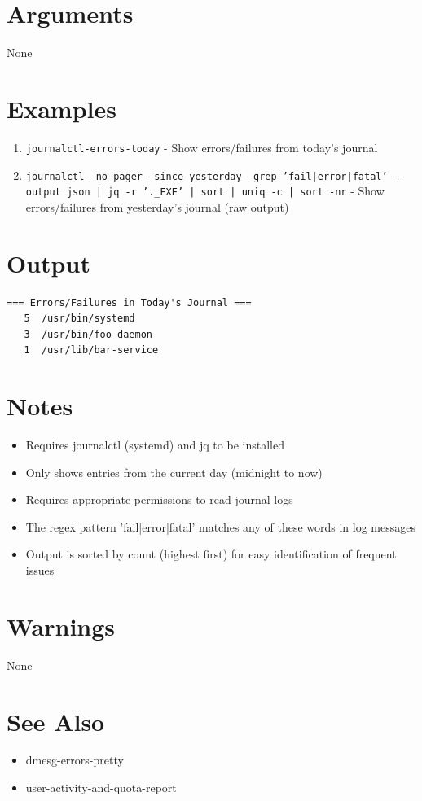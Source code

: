 \documentclass{article}
\begin{document}
\section*{Arguments}
None

\section*{Examples}
\begin{enumerate}
  \item \texttt{journalctl-errors-today} - Show errors/failures from today's journal
  \item \texttt{journalctl --no-pager --since yesterday --grep 'fail|error|fatal' --output json | jq -r '.\_EXE' | sort | uniq -c | sort -nr} - Show errors/failures from yesterday's journal (raw output)
\end{enumerate}

\section*{Output}
\begin{lstlisting}
=== Errors/Failures in Today's Journal ===
   5  /usr/bin/systemd
   3  /usr/bin/foo-daemon
   1  /usr/lib/bar-service
\end{lstlisting}

\section*{Notes}
\begin{itemize}
  \item Requires journalctl (systemd) and jq to be installed
  \item Only shows entries from the current day (midnight to now)
  \item Requires appropriate permissions to read journal logs
  \item The regex pattern 'fail|error|fatal' matches any of these words in log messages
  \item Output is sorted by count (highest first) for easy identification of frequent issues
\end{itemize}

\section*{Warnings}
None

\section*{See Also}
\begin{itemize}
  \item dmesg-errors-pretty
  \item user-activity-and-quota-report
\end{itemize}
\end{document}
